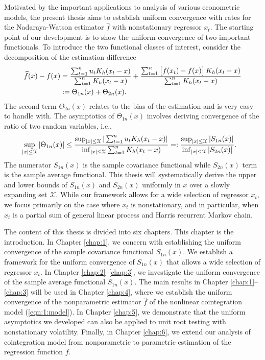 Motivated by the important applications to analysis of various econometric models, the present thesis aims to establish uniform convergence with rates for the Nadaraya-Watson estimator $\widehat{f}$ with nonstationary regressor $x_t$. The starting point of our development is to show the uniform convergence of two important functionals. To introduce the two functional classes of interest, consider the decomposition of the estimation difference
\begin{align}
	\widehat{f}(x)-f(x) &= \frac{\sum_{t=1}^{n}u_{t}K_{h}(x_{t}-x)}{ \sum_{t=1}^{n}K_{h}(x_{t}-x)}+\frac{\sum_{t=1}^{n}\big[f(x_{t})-f(x)\big] \,K_{h}(x_{t}-x)}{\sum_{t=1}^{n}K_{h}(x_{t}-x)} \nonumber\\
&:= \Theta_{1n}(x)+\Theta_{2n}(x).\nonumber
\end{align}
The second term $\Theta_{2n}(x)$ relates to the bias of the estimation and is very easy to handle with. The asymptotics of $\Theta_{1n}(x)$ involves deriving convergence of the ratio of two random variables, i.e.,
\begin{align}
 \sup_{|x| \le \mathcal{X}} |\Theta_{1n}(x)| &\le \frac{\sup_{|x| \le \mathcal{X}}|\sum_{t=1}^{n}u_{t}K_h(x_{t}-x)|}{\inf_{|x| \le \mathcal{X}}\sum_{t=1}^{n}K_h(x_{t}-x)}  =: \frac{\sup_{|x| \le \mathcal{X}}|S_{1n}(x)|}{\inf_{|x| \le \mathcal{X}}|S_{2n}(x)|}. \nonumber
\end{align}
The numerator $S_{1n}(x)$ is the sample covariance functional while $S_{2n}(x)$ term is the sample average functional. This thesis will systematically derive the upper and lower bounds of $S_{1n}(x)$ and $S_{2n}(x)$ uniformly in $x$ over a slowly expanding set $\mathcal{X}$. While our framework allows for a wide selection of regressor $x_t$, we focus primarily on the case where $x_t$ is nonstationary, and in particular, when $x_t$ is a partial sum of general linear process and Harris recurrent Markov chain.

The content of this thesis is divided into six chapters. This chapter is the introduction. In Chapter \ref{chap:1}, we concern with establishing the uniform convergence of the sample covariance functional $S_{1n}(x)$. We establish a framework for the uniform convergence of $S_{1n}(x)$ that allows a wide selection of regressor $x_t$. In Chapter \ref{chap:2}--\ref{chap:3}, we investigate the uniform convergence of the sample average functional $S_{1n}(x)$. The main results in Chapter \ref{chap:1}--\ref{chap:3} will be used in Chapter \ref{chap:4}, where we establish the uniform convergence of the nonparametric estimator $\widehat{f}$ of the nonlinear cointegration model (\ref{eqn:1:model}). In Chapter \ref{chap:5}, we demonstrate that the uniform asymptotics we developed can also be applied to unit root testing with nonstationary volatility. Finally, in Chapter \ref{chap:6}, we extend our analysis of cointegration model from nonparametric to parametric estimation of the regression function $f$.

